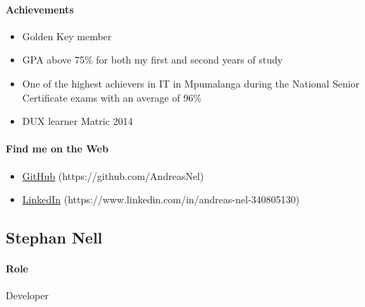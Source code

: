 \documentclass{article}
\begin{document}
        \paragraph{Achievements}
            \begin{itemize}
                \item Golden Key member
                \item GPA above 75\% for both my first and second years of study
                \item One of the highest achievers in IT in Mpumalanga during the National Senior Certificate exams with an average of 96\%
                \item DUX learner Matric 2014
            \end{itemize}
            
        \paragraph{Find me on the Web}
            \begin{itemize}
                \item \href{https://github.com/AndreasNel}{GitHub} (https://github.com/AndreasNel)
                \item \href{https://www.linkedin.com/in/andreas-nel-340805130}{LinkedIn} (https://www.linkedin.com/in/andreas-nel-340805130)
            \end{itemize}
\newpage    
    \subsection{Stephan Nell}
        \paragraph{Role} Developer
        
\end{document}
